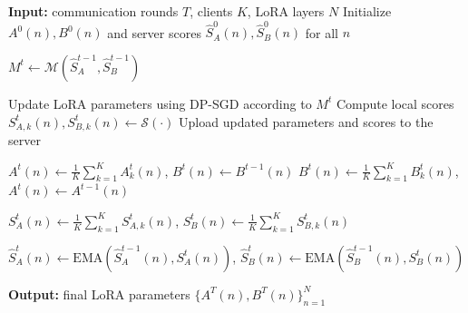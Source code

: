 \FloatBarrier
\begin{algorithm}[h]
\caption{AS-LoRA}
\label{alg:as_lora}
\begin{algorithmic}[1]

\STATE \textbf{Input:} communication rounds $T$, clients $K$, LoRA layers $N$
\STATE Initialize $A^0(n), B^0(n)$ and server scores 
$\hat{S}_A^{0}(n), \hat{S}_B^{0}(n)$ for all $n$

    \STATE $M^t \leftarrow \mathcal{M}(\hat{S}_A^{t-1}, \hat{S}_B^{t-1})$
    
        \STATE Update LoRA parameters using DP-SGD according to $M^t$
        \STATE Compute local scores 
        $S_{A,k}^t(n), S_{B,k}^t(n) \leftarrow \mathcal{S}(\cdot)$
        \STATE Upload updated parameters and scores to the server
    \ENDFOR

            \STATE $A^t(n) \leftarrow \frac{1}{K}\sum_{k=1}^{K} A_k^t(n)$, 
            \quad $B^t(n) \leftarrow B^{t-1}(n)$
        \ELSE
            \STATE $B^t(n) \leftarrow \frac{1}{K}\sum_{k=1}^{K} B_k^t(n)$, 
            \quad $A^t(n) \leftarrow A^{t-1}(n)$
        \ENDIF

        \STATE $S_A^t(n) \leftarrow \frac{1}{K}\sum_{k=1}^{K} S_{A,k}^t(n)$, 
        \quad
        $S_B^t(n) \leftarrow \frac{1}{K}\sum_{k=1}^{K} S_{B,k}^t(n)$

        \STATE $\hat{S}_A^t(n) \leftarrow 
        \mathrm{EMA}\left(\hat{S}_A^{t-1}(n), S_A^t(n)\right)$,
        \quad
        $\hat{S}_B^t(n) \leftarrow 
        \mathrm{EMA}\left(\hat{S}_B^{t-1}(n), S_B^t(n)\right)$
    \ENDFOR
\ENDFOR

\STATE \textbf{Output:} final LoRA parameters $\{A^T(n), B^T(n)\}_{n=1}^{N}$

\end{algorithmic}
\end{algorithm}
